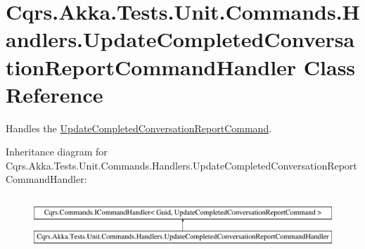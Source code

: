 \hypertarget{classCqrs_1_1Akka_1_1Tests_1_1Unit_1_1Commands_1_1Handlers_1_1UpdateCompletedConversationReportCommandHandler}{}\section{Cqrs.\+Akka.\+Tests.\+Unit.\+Commands.\+Handlers.\+Update\+Completed\+Conversation\+Report\+Command\+Handler Class Reference}
\label{classCqrs_1_1Akka_1_1Tests_1_1Unit_1_1Commands_1_1Handlers_1_1UpdateCompletedConversationReportCommandHandler}


Handles the \hyperlink{classCqrs_1_1Akka_1_1Tests_1_1Unit_1_1Commands_1_1UpdateCompletedConversationReportCommand}{Update\+Completed\+Conversation\+Report\+Command}.  


Inheritance diagram for Cqrs.\+Akka.\+Tests.\+Unit.\+Commands.\+Handlers.\+Update\+Completed\+Conversation\+Report\+Command\+Handler\+:\begin{figure}[H]
\begin{center}
\leavevmode
\includegraphics[height=1.964912cm]{classCqrs_1_1Akka_1_1Tests_1_1Unit_1_1Commands_1_1Handlers_1_1UpdateCompletedConversationReportCommandHandler}
\end{center}
\end{figure}
